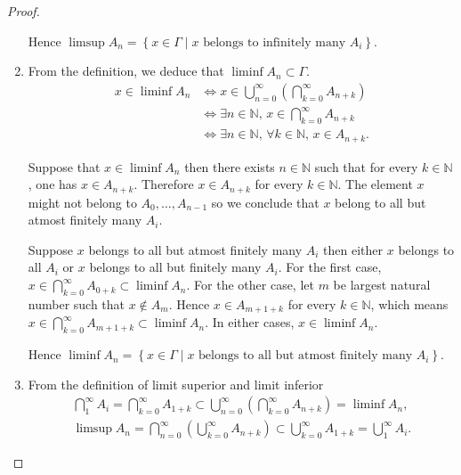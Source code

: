\begin{proof}
\begin{enumerate}[label={(\alph*)}, leftmargin=*]
		      Hence \( \limsup A_{n} = \left\{ x \in \Gamma \mid x \text{ belongs to infinitely many } A_{i} \right\} \).
		\item From the definition, we deduce that \( \liminf A_{n} \subset \Gamma \).
		      \begingroup
		      \allowdisplaybreaks%
		      \begin{align*}
			      x \in \liminf A_{n} & \iff x \in \bigcup^{\infty}_{n=0}\left(\bigcap^{\infty}_{k=0} A_{n+k}\right) \\
			                          & \iff \exists n \in \mathbb{N},\, x \in \bigcap^{\infty}_{k=0} A_{n+k}        \\
			                          & \iff \exists n \in \mathbb{N},\, \forall k \in \mathbb{N},\, x \in A_{n+k}.
		      \end{align*}
		      \endgroup

		      Suppose that \( x \in \liminf A_{n} \) then there exists \( n \in \mathbb{N} \) such that for every \( k \in \mathbb{N} \), one has \( x \in A_{n + k} \). Therefore \( x \in A_{n + k} \) for every \( k \in \mathbb{N} \). The element \( x \) might not belong to \( A_{0}, \ldots, A_{n-1} \) so we conclude that \( x \) belong to all but atmost finitely many \( A_{i} \).

		      Suppose \( x \) belongs to all but atmost finitely many \( A_{i} \) then either \( x \) belongs to all \( A_{i} \) or \( x \) belongs to all but finitely many \( A_{i} \). For the first case, \( x \in \displaystyle\bigcap^{\infty}_{k=0}A_{0+k} \subset \liminf A_{n} \). For the other case, let \( m \) be largest natural number such that \( x \notin A_{m} \). Hence \( x \in A_{m+1+k} \) for every \( k \in \mathbb{N} \), which means \( x \in \displaystyle\bigcap^{\infty}_{k=0} A_{m+1+k} \subset \liminf A_{n} \). In either cases, \( x \in \liminf A_{n} \).

		      Hence \( \liminf A_{n} = \left\{ x \in \Gamma \mid x \text{ belongs to all but atmost finitely many } A_{i} \right\} \).
		\item From the definition of limit superior and limit inferior
		      \[
			      \begin{split}
				      \bigcap^{\infty}_{1} A_{i} = \bigcap^{\infty}_{k=0} A_{1+k} \subset \bigcup^{\infty}_{n=0}\left(\bigcap^{\infty}_{k=0} A_{n+k}\right) = \liminf A_{n}, \\
				      \limsup A_{n} = \bigcap^{\infty}_{n=0}\left(\bigcup^{\infty}_{k=0} A_{n+k}\right) \subset \bigcup^{\infty}_{k=0} A_{1+k} = \bigcup^{\infty}_{1} A_{i}.
			      \end{split}
		      \]


\end{enumerate}
\end{proof}
